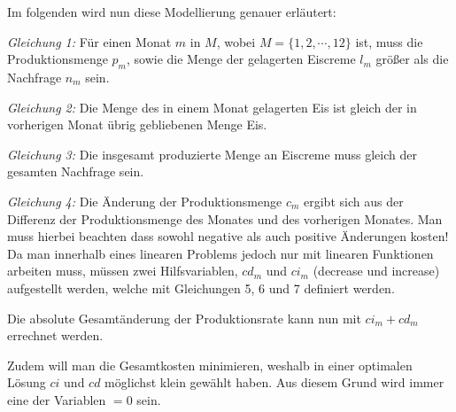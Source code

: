 Im folgenden wird nun diese Modellierung genauer erläutert:

\emph{Gleichung 1:} Für einen Monat $m$ in $M$, wobei $M = \{1, 2, \cdots, 12\}$ ist, muss die Produktionsmenge $p_m$, sowie die Menge der gelagerten Eiscreme $l_m$ größer als die Nachfrage $n_m$ sein.

\emph{Gleichung 2:} Die Menge des in einem Monat gelagerten Eis ist gleich der in vorherigen Monat übrig gebliebenen Menge Eis.

\emph{Gleichung 3:} Die insgesamt produzierte Menge an Eiscreme muss gleich der gesamten Nachfrage sein.

\emph{Gleichung 4:} Die Änderung der Produktionsmenge $c_m$ ergibt sich aus der Differenz der Produktionsmenge des Monates und des vorherigen Monates.
Man muss hierbei beachten dass sowohl negative als auch positive Änderungen kosten! Da man innerhalb eines linearen Problems jedoch nur mit linearen Funktionen arbeiten muss, müssen zwei Hilfsvariablen, $cd_m$ und $ci_m$ (decrease und increase) aufgestellt werden, welche mit Gleichungen 5, 6 und 7 definiert werden.
	
 Die absolute Gesamtänderung der Produktionsrate kann nun mit $ci_m + cd_m$ errechnet werden.

Zudem will man die Gesamtkosten minimieren, weshalb in einer optimalen Lösung $ci$ und $cd$ möglichst klein gewählt haben. Aus diesem Grund wird immer eine der Variablen $= 0$ sein.